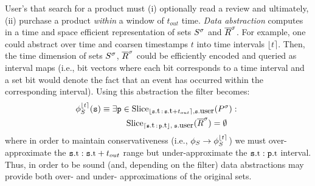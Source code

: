 \newcommand{\interval}[1]{\lfloor #1 \rceil}
\newcommand{\uinterval}[1]{\lceil #1 \rfloor}
\newcommand{\hashid}[1]{\# #1}

User's that search for a product must (i) optionally read a review and
ultimately, (ii) purchase a product \emph{within} a window of $t_{out}$
time. \emph{Data abstraction} computes in a time and space efficient
representation of sets ${S}^{\sigma}$ and ${\overline{R}}^{\sigma}$.  For example, one could
abstract over time and coarsen timestamps $t$ into time intervals
$\interval{t}$.  Then, the time dimension of sets ${S}^{\sigma}$, ${\overline{R}}^{\sigma}$ could
be efficiently encoded and queried as interval maps (i.e., bit vectors where
each bit corresponds to a time interval and a set bit would denote the fact that
an event has occurred within the corresponding interval).  Using this
abstraction the filter becomes:
\begin{align*}
\PrecedesP^{\interval{t}}(\symv{s}) 
&\equiv  
\exists \symv{p} \in 
\slice{\syms{P}}
{\interval{\facc{\symv{s}}{t}\,:\,\facc{\symv{s}}{t} + t_{out}},
	\facc{\symv{s}}{user}} :\ 
\\
&\qquad\quad
\slice{\syms{\oR}}
{\uinterval{\facc{\symv{s}}{t}\,:\,\facc{\symv{p}}{t}},\; 
	\facc{\symv{s}}{user}}
= \emptyset 
\end{align*}
where in order to maintain conservativeness (i.e.,
$\PrecedesP \rightarrow \PrecedesP^{\interval{t}} $) we must over-approximate
the $\facc{\symv{s}}{t}:\facc{\symv{s}}{t} + t_{out}$ range but
under-approximate the $\facc{\symv{s}}{t}:\facc{\symv{p}}{t}$ interval.  Thus,
in order to be sound (and, depending on the filter) data abstractions may
provide both over- and under- approximations of the original sets.



